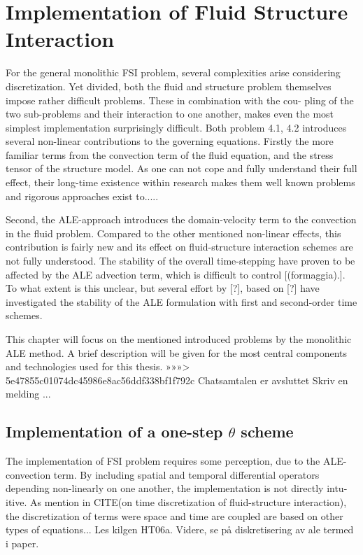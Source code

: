 \chapter{Implementation of Fluid Structure Interaction}

For the general monolithic FSI problem, several complexities
arise considering discretization. Yet divided, both the fluid and structure problem
themselves impose rather difficult problems. These in combination with the cou-
pling of the two sub-problems and their interaction to one another, makes even the
most simplest implementation surprisingly difficult.
Both problem 4.1, 4.2 introduces several non-linear contributions to the governing
equations. Firstly the more familiar terms from the convection term of the fluid
equation, and the stress tensor of the structure model. As one can not cope and
fully understand their full effect, their long-time existence within research makes
them well known problems and rigorous approaches exist to.....

Second, the ALE-approach introduces the domain-velocity term to the convection
in the fluid problem. Compared to the other mentioned non-linear effects, this
contribution is fairly new and its effect on fluid-structure interaction schemes are
not fully understood. The stability of the overall time-stepping have proven to be
affected by the ALE advection term, which is difficult to control [(formaggia).]. To what extent
is this unclear, but several effort by [?], based on [?] have investigated the stability
of the ALE formulation with first and second-order time schemes.

This chapter will focus on the mentioned introduced problems
by the monolithic ALE method. A brief description will be given for the most central
components and technologies used for this thesis. »»»> 5e47855c01074dc45986e8ac56ddf338bf1f792c
Chatsamtalen er avsluttet
Skriv en melding ...


\section{Implementation of a one-step $\theta$ scheme} 
The implementation of FSI problem requires some perception, due to the ALE-
convection term. By including spatial and temporal differential operators 
depending non-linearly on one another, the implementation is not directly intu-
itive. As mention in CITE(on time discretization of fluid-structure interaction),
the discretization of terms were space and time are coupled are based on other
types of equations... Les kilgen HT06a. Videre, se på diskretisering av ale termed
i paper.


